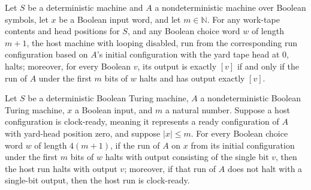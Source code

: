 \begin{theorem}
\label{Turing.ClockHost.oneShot}
\leanok
{}
Let $S$ be a deterministic machine and $A$ a nondeterministic machine over Boolean
symbols, let $x$ be a Boolean input word, and let $m\in\mathbb N$. For any work-tape
contents and head positions for $S$, and any Boolean choice word $w$ of length $m+1$,
the host machine with looping disabled, run from the corresponding run configuration
based on $A$’s initial configuration with the yard tape head at $0$, halts; moreover,
for every Boolean $v$, its output is exactly $[v]$ if and only if the run of $A$ under
the first $m$ bits of $w$ halts and has output exactly $[v]$.
\end{theorem}

\begin{theorem}
\label{Turing.ClockHost.round}
\leanok
{}
Let $S$ be a deterministic Boolean Turing machine, $A$ a nondeterministic Boolean Turing
machine, $x$ a Boolean input, and $m$ a natural number. Suppose a host configuration is
clock-ready, meaning it represents a ready configuration of $A$ with yard-head position
zero, and suppose $|x|\le m$. For every Boolean choice word $w$ of length $4(m+1)$, if
the run of $A$ on $x$ from its initial configuration under the first $m$ bits of $w$
halts with output consisting of the single bit $v$, then the host run halts with output
$v$; moreover, if that run of $A$ does not halt with a single-bit output, then the host
run is clock-ready.
\end{theorem}
